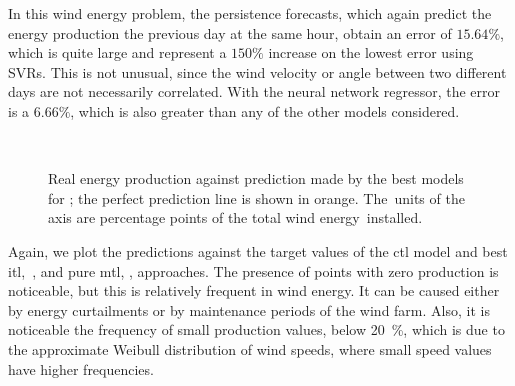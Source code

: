 %
In this wind energy problem, the persistence forecasts, which again predict the energy production the previous day at the same hour, obtain an error of $15.64\%$, which is quite large and represent a $150\%$ increase on the lowest error using SVRs. This is not unusual, since the wind velocity or angle between two different days are not necessarily correlated.
%
With the neural network regressor, the error is a $6.66\%$, which is also greater than any of the other models considered.

\begin{figure}[t!]
    \centering%
    \quad%
    \quad%
    \\
 \caption[Real energy production against prediction made by the best models for .]{\label{fig:stv_best_plots} Real energy production against prediction made by the best models for ; the perfect prediction line is shown in orange. The~units of the axis are percentage points of the total wind energy~installed.}
 \end{figure}

%
Again, we plot the predictions against the target values of the \acrshort{ctl} model and best \acrshort{itl},~, and pure \acrshort{mtl}, , approaches.
The presence of points with zero production is noticeable, but this is relatively frequent in wind energy. It can be caused either by energy curtailments or by maintenance periods of the wind farm.
Also, it is noticeable the frequency of small production values, below \SI{20}{\percent}, which is due to the approximate Weibull distribution of wind speeds, where small speed values have higher frequencies. 









